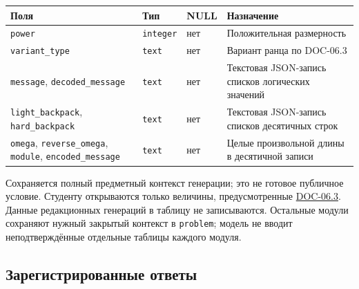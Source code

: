 \documentclass[12pt,a4paper]{article}
\newcounter{none} %
\begin{document}
{\def\LTcaptype{none} %
\begin{longtable}[]{@{}
  >{\raggedright\arraybackslash}p{}
  >{\raggedright\arraybackslash}p{}
  >{\raggedright\arraybackslash}p{}
  >{\raggedright\arraybackslash}p{}@{}}
\toprule\noalign{}
\begin{minipage}[b]{\linewidth}\raggedright
Поля
\end{minipage} & \begin{minipage}[b]{\linewidth}\raggedright
Тип
\end{minipage} & \begin{minipage}[b]{\linewidth}\raggedright
NULL
\end{minipage} & \begin{minipage}[b]{\linewidth}\raggedright
Назначение
\end{minipage} \\
\midrule\noalign{}
\endhead
\bottomrule\noalign{}
\endlastfoot
\texttt{power} & \texttt{integer} & нет & Положительная размерность \\
\texttt{variant\_\allowbreak{}type} & \texttt{text} & нет & Вариант ранца по DOC-06.3 \\
\texttt{message}, \texttt{decoded\_\allowbreak{}message} & \texttt{text} & нет & Текстовая JSON-запись списков логических значений \\
\texttt{light\_\allowbreak{}backpack}, \texttt{hard\_\allowbreak{}backpack} & \texttt{text} & нет & Текстовая JSON-запись списков десятичных строк \\
\texttt{omega}, \texttt{reverse\_\allowbreak{}omega}, \texttt{module}, \texttt{encoded\_\allowbreak{}message} & \texttt{text} & нет & Целые произвольной длины в десятичной записи \\
\end{longtable}
}

Сохраняется полный предметный контекст генерации; это не готовое публичное условие. Студенту открываются только величины, предусмотренные {\href{DOC-06.3\_Ранцевые\_криптосистемы.pdf\#6-хранение}{DOC-06.3}}. Данные редакционных генераций в таблицу не записываются. Остальные модули сохраняют нужный закрытый контекст в \texttt{problem}; модель не вводит неподтверждённые отдельные таблицы каждого модуля.

\subsection{Зарегистрированные ответы}\label{ux437ux430ux440ux435ux433ux438ux441ux442ux440ux438ux440ux43eux432ux430ux43dux43dux44bux435-ux43eux442ux432ux435ux442ux44b}
\end{document}
